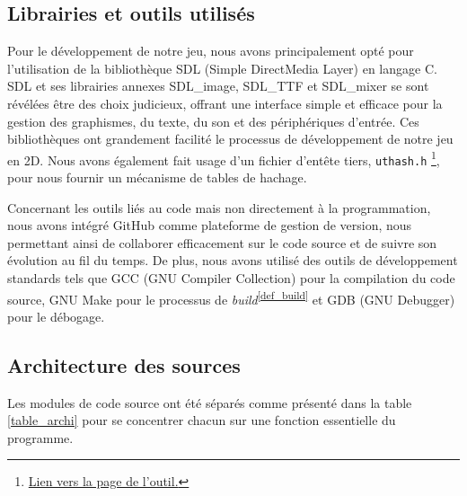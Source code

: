 \documentclass[a4paper,12pt]{article}
\newcommand\refsuscrite[1]{\textsuperscript{\ref{#1}}}
\begin{document}
\subsection{Librairies et outils utilisés}

Pour le développement de notre jeu, nous avons principalement opté pour l'utilisation de la bibliothèque SDL (Simple DirectMedia Layer) en langage C.
SDL et ses librairies annexes SDL\_image, SDL\_TTF et SDL\_mixer se sont révélées être des choix judicieux, offrant une interface simple et efficace pour la gestion des graphismes, du texte, du son et des périphériques d'entrée.
Ces bibliothèques ont grandement facilité le processus de développement de notre jeu en 2D.
Nous avons également fait usage d’un fichier d’entête tiers, \texttt{uthash.h} \footnote{\href{https://troydhanson.github.io/uthash/userguide.html}{Lien vers la page de l’outil.}}, pour nous fournir un mécanisme de tables de hachage.

Concernant les outils liés au code mais non directement à la programmation, nous avons intégré GitHub comme plateforme de gestion de version, nous permettant ainsi de collaborer efficacement sur le code source et de suivre son évolution au fil du temps.
De plus, nous avons utilisé des outils de développement standards tels que GCC (GNU Compiler Collection) pour la compilation du code source, GNU Make pour le processus de \textit{build}\refsuscrite{def_build} et GDB (GNU Debugger) pour le débogage.

\subsection{Architecture des sources}

Les modules de code source ont été séparés comme présenté dans la table \ref{table_archi} pour se concentrer chacun sur une fonction essentielle du programme.
\end{document}
